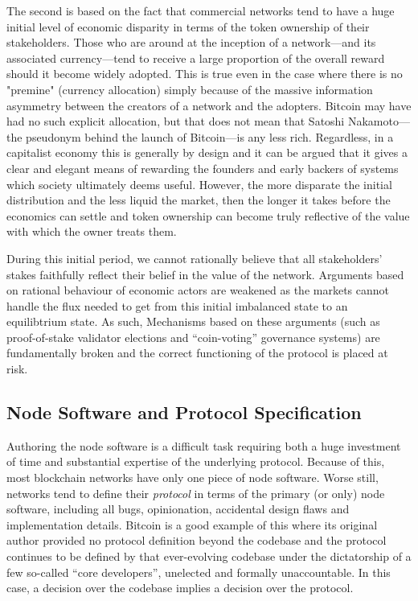 \documentclass[9pt,oneside]{amsart}
\begin{document}
The second is based on the fact that commercial networks tend to have a huge initial level of economic disparity in terms of the token ownership of their stakeholders. Those who are around at the inception of a network---and its associated currency---tend to receive a large proportion of the overall reward should it become widely adopted. This is true even in the case where there is no "premine" (currency allocation) simply because of the massive information asymmetry between the creators of a network and the adopters. Bitcoin may have had no such explicit allocation, but that does not mean that Satoshi Nakamoto---the pseudonym behind the launch of Bitcoin---is any less rich. Regardless, in a capitalist economy this is generally by design and it can be argued that it gives a clear and elegant means of rewarding the founders and early backers of systems which society ultimately deems useful. However, the more disparate the initial distribution and the less liquid the market, then the longer it takes before the economics can settle and token ownership can become truly reflective of the value with which the owner treats them.

During this initial period, we cannot rationally believe that all stakeholders' stakes faithfully reflect their belief in the value of the network. Arguments based on rational behaviour of economic actors are weakened as the markets cannot handle the flux needed to get from this initial imbalanced state to an equilibtrium state. As such, Mechanisms based on these arguments (such as proof-of-stake validator elections and ``coin-voting'' governance systems) are fundamentally broken and the correct functioning of the protocol is placed at risk.

\subsection{Node Software and Protocol Specification}

Authoring the node software is a difficult task requiring both a huge investment of time and substantial expertise of the underlying protocol. Because of this, most blockchain networks have only one piece of node software. Worse still, networks tend to define their \emph{protocol} in terms of the primary (or only) node software, including all bugs, opinionation, accidental design flaws and implementation details. Bitcoin is a good example of this where its original author provided no protocol definition beyond the codebase and the protocol continues to be defined by that ever-evolving codebase under the dictatorship of a few so-called ``core developers'', unelected and formally unaccountable. In this case, a decision over the codebase implies a decision over the protocol.
\end{document}
